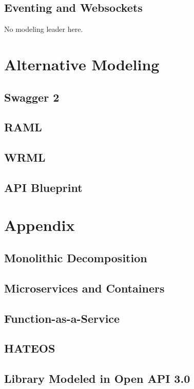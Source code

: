 \documentclass[12pt,oneside]{book} %
\begin{document}
\section{Eventing and Websockets}
No modeling leader here.

\chapter{Alternative Modeling}
\section{Swagger 2}
\section{RAML}
\section{WRML}
\section{API Blueprint}

\chapter{Appendix}
\section{Monolithic Decomposition}
\section{Microservices and Containers}
\section{Function-as-a-Service}
\section{HATEOS}
\section{Library Modeled in Open API 3.0}



\end{document}
